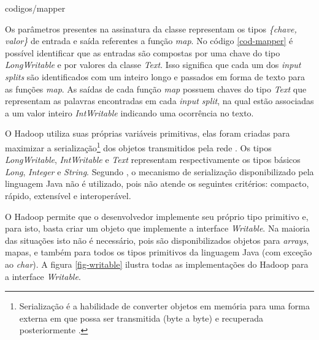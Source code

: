 
		{codigos/mapper}

Os parâmetros presentes na assinatura da classe representam os tipos \textit{\{chave, valor\}} de entrada e saída referentes a função \textit{map}. No código \ref{cod-mapper} é possível identificar que as entradas são compostas por uma chave do tipo \textit{LongWritable} e por valores da classe \textit{Text}. Isso significa que cada um dos \textit{input splits} são identificados com um inteiro longo e passados em forma de texto para as funções \textit{map}. As saídas de cada função \textit{map} possuem chaves do tipo \textit{Text} que representam as palavras encontradas em cada \textit{input split}, na qual estão associadas a um valor inteiro \textit{IntWritable} indicando uma ocorrência no texto.

O Hadoop utiliza suas próprias variáveis primitivas, elas foram criadas para maximizar a serialização\footnote{Serialização é a habilidade de converter objetos em memória para uma forma externa em que possa ser transmitida (byte a byte) e recuperada posteriormente \cite{darwin2014}.} dos objetos transmitidos pela rede \cite{white2012}. Os tipos \textit{LongWritable}, \textit{IntWritable} e \textit{Text} representam respectivamente os tipos básicos \textit{Long}, \textit{Integer} e \textit{String}. Segundo , o mecanismo de serialização disponibilizado pela linguagem Java não é utilizado, pois não atende os seguintes critérios: compacto, rápido, extensível e interoperável.

O Hadoop permite que o desenvolvedor implemente seu próprio tipo primitivo e, para isto, basta criar um objeto que implemente a interface \textit{Writable}. Na maioria das situações isto não é necessário, pois são disponibilizados objetos para \textit{arrays}, mapas, e também para todos os tipos primitivos da linguagem Java (com exceção ao \textit{char}). A figura \ref{fig-writable} ilustra todas as implementações do Hadoop para a interface \textit{Writable}.

